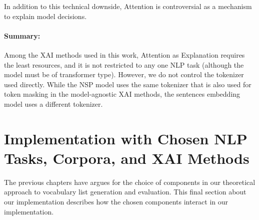 In addition to this technical downside, Attention is controversial as a mechanism to explain model decisions.

\paragraph{Summary:}
Among the XAI methods used in this work, Attention as Explanation requires the least resources, and it is not restricted to any one NLP task (although the model must be of transformer type).
However, we do not control the tokenizer used directly.
While the NSP model uses the same tokenizer that is also used for token masking in the model-agnostic XAI methods, the sentences embedding model uses a different tokenizer.



%
%
\section{Implementation with Chosen NLP Tasks, Corpora, and XAI Methods} \label{sec:implementation-final}
The previous chapters have argues for the choice of components in our theoretical approach to vocabulary list generation and evaluation.
This final section about our implementation describes how the chosen components interact in our implementation.

